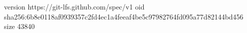 version https://git-lfs.github.com/spec/v1
oid sha256:6b8e0118af0939357c2fd4ec1a4feeaf4be5c97982764fd095a77d82144bd456
size 43840

